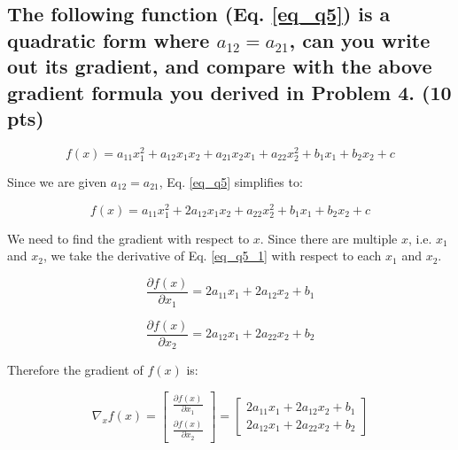 \subsection{The following function (Eq. \ref{eq_q5}) is a quadratic form where $a_{12}=a_{21}$, can you write out its gradient, and compare with the above gradient formula you derived in Problem 4. (10 pts)}

\begin{equation}
    f(x) = a_{11}x_1^2 + a_{12}x_1 x_2 + a_{21}x_2 x_1 + a_{22} x_2^2 + b_1 x_1 + b_2 x_2 + c
    \label{eq_q5}
\end{equation}

Since we are given $a_{12}=a_{21}$, Eq. \ref{eq_q5} simplifies to:

\begin{equation}
    f(x) = a_{11}x_1^2 + 2 a_{12}x_1 x_2 + a_{22} x_2^2 + b_1 x_1 + b_2 x_2 + c
    \label{eq_q5_1}
\end{equation}

We need to find the gradient with respect to $x$. Since there are multiple $x$, i.e. $x_1$ and $x_2$, we take the derivative of Eq. \ref{eq_q5_1} with respect to each $x_1$ and $x_2$.

\begin{equation}
    \frac{\partial f(x)}{\partial x_1} = 2 a_{11}x_1 + 2 a_{12}x_2 + b_1
    \label{eq_q5_2}
\end{equation}

\begin{equation}
    \frac{\partial f(x)}{\partial x_2} = 2 a_{12}x_1 + 2 a_{22}x_2 + b_2
    \label{eq_q5_3}
\end{equation}

Therefore the gradient of $f(x)$ is:

\begin{equation}
    \nabla_x f(x) = \begin{bmatrix}
        \frac{\partial f(x)}{\partial x_1} \\
        \frac{\partial f(x)}{\partial x_2}
    \end{bmatrix}
    = \begin{bmatrix}
        2 a_{11}x_1 + 2 a_{12}x_2 + b_1 \\
        2 a_{12}x_1 + 2 a_{22}x_2 + b_2
    \end{bmatrix}
    \label{eq_q5_4}
\end{equation}

